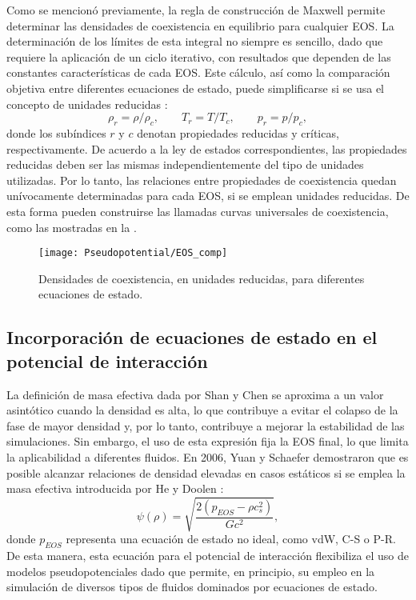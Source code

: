 Como se mencion\'o previamente, la regla de construcci\'on de Maxwell permite determinar las densidades de coexistencia en equilibrio para cualquier EOS. La determinaci\'on de los l\'imites de esta integral no siempre es sencillo, dado que requiere la aplicaci\'on de un ciclo iterativo, con resultados que dependen de las constantes caracter\'isticas de cada EOS. Este c\'alculo, as\'i como la comparaci\'on objetiva entre diferentes ecuaciones de estado, puede simplificarse si se usa el concepto de unidades reducidas \cite{mcquarrie_molecular_1999}:
\begin{equation}
	\rho_r = \rho / \rho_c, \qquad T_r = T / T_c, \qquad p_r = p / p_c,
\end{equation}
donde los sub\'indices $r$ y $c$ denotan propiedades reducidas y cr\'iticas, respectivamente. De acuerdo a la ley de estados correspondientes, las propiedades reducidas deben ser las mismas independientemente del tipo de unidades utilizadas. Por lo tanto, las relaciones entre propiedades de coexistencia quedan un\'ivocamente determinadas para cada EOS, si se emplean unidades reducidas. De esta forma pueden construirse las llamadas curvas universales de coexistencia, como las mostradas en la .

\begin{figure}[ht]
	\centering
	\texttt{[image: Pseudopotential/EOS\_comp]}
	\caption{Densidades de coexistencia, en unidades reducidas, para diferentes ecuaciones de estado.}
	\label{fig:EOS}
\end{figure}




\subsection{Incorporaci\'on de ecuaciones de estado en el potencial de interacci\'on}

La definici\'on de masa efectiva dada por Shan y Chen se aproxima a un valor asint\'otico cuando la densidad es alta, lo que contribuye a evitar el colapso de la fase de mayor densidad y, por lo tanto, contribuye a mejorar la estabilidad de las simulaciones. Sin embargo, el uso de esta expresi\'on fija la EOS final, lo que limita la aplicabilidad a diferentes fluidos. En 2006, Yuan y Schaefer \cite{yuan_equations_2006} demostraron que es posible alcanzar relaciones de densidad elevadas en casos est\'aticos si se emplea la masa efectiva introducida por He y Doolen \cite{he_thermodynamic_2002}:
\begin{equation}
	\psi(\rho) = \sqrt{\dfrac{2(p_{EOS} - \rho c_s^2)}{Gc^2}},
	\label{eq:potencial}
\end{equation}
donde $p_{EOS}$ representa una ecuaci\'on de estado no ideal, como vdW, C-S o P-R. De esta manera, esta ecuaci\'on para el potencial de interacci\'on flexibiliza el uso de modelos pseudopotenciales dado que permite, en principio, su empleo en la simulaci\'on de diversos tipos de fluidos dominados por ecuaciones de estado.




